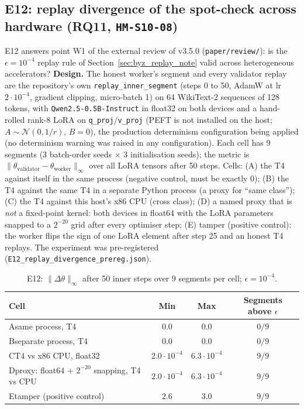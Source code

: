 \documentclass[11pt,a4paper]{article}
\begin{document}
\subsection{E12: replay divergence of the spot-check across hardware (RQ11, \texttt{HM-S10-08})}
\label{sec:e12}

E12 answers point W1 of the external review of v3.5.0 (\texttt{paper/review/}): is the $\epsilon = 10^{-4}$ replay rule of Section~\ref{sec:byz_replay_note} valid across heterogeneous accelerators? \textbf{Design.} The honest worker's segment and every validator replay are the repository's own \texttt{replay\_inner\_segment} (steps 0 to 50, AdamW at lr $2\cdot10^{-4}$, gradient clipping, micro-batch 1) on 64 WikiText-2 sequences of 128 tokens, with \texttt{Qwen2.5-0.5B-Instruct} in float32 on both devices and a hand-rolled rank-8 LoRA on \texttt{q\_proj}/\texttt{v\_proj} (PEFT is not installed on the host; $A\sim\mathcal{N}(0,1/r)$, $B=0$), the production determinism configuration being applied (no determinism warning was raised in any configuration). Each cell has $9$ segments (3 batch-order seeds $\times$ 3 initialisation seeds); the metric is $\|\theta_{\text{validator}}-\theta_{\text{worker}}\|_\infty$ over all LoRA tensors after 50 steps. Cells: (A) the T4 against itself in the same process (negative control, must be exactly $0$); (B) the T4 against the same T4 in a separate Python process (a proxy for ``same class''); (C) the T4 against this host's x86 CPU (cross class); (D) a named proxy that is \emph{not} a fixed-point kernel: both devices in float64 with the LoRA parameters snapped to a $2^{-20}$ grid after every optimiser step; (E) tamper (positive control): the worker flips the sign of one LoRA element after step 25 and an honest T4 replays. The experiment was pre-registered (\texttt{E12\_replay\_divergence\_prereg.json}).

\begin{table}[ht!]
\centering
\caption{E12: $\|\Delta\theta\|_\infty$ after 50 inner steps over 9 segments per cell; $\epsilon = 10^{-4}$.}
\label{tab:e12}
\vspace{0.35em}
\begin{tabular}{@{}lccc@{}}
\toprule
\textbf{Cell} & \textbf{Min} & \textbf{Max} & \textbf{Segments above $\epsilon$} \\
\midrule
A\;same process, T4 & $0.0$ & $0.0$ & $0/9$ \\
B\;separate process, T4 & $0.0$ & $0.0$ & $0/9$ \\
C\;T4 vs x86 CPU, float32 & $2.0\cdot10^{-4}$ & $6.3\cdot10^{-4}$ & $9/9$ \\
D\;proxy: float64 + $2^{-20}$ snapping, T4 vs CPU & $2.0\cdot10^{-4}$ & $6.3\cdot10^{-4}$ & $9/9$ \\
E\;tamper (positive control) & $2.6$ & $3.0$ & $9/9$ \\
\bottomrule
\end{tabular}
\end{table}
\end{document}
